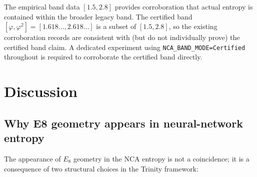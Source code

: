 \begin{center}
\end{center}

The empirical band data \([1.5, 2.8]\) provides corroboration that
actual entropy is contained within the broader legacy band.  The
certified band \([\varphi, \varphi^2] = [1.618\ldots, 2.618\ldots]\)
is a subset of \([1.5, 2.8]\), so the existing corroboration records
are consistent with (but do not individually prove) the certified
band claim.  A dedicated experiment using \texttt{NCA\_BAND\_MODE=Certified}
throughout is required to corroborate the certified band directly.

\section{Discussion}
\label{sec:e8-discussion}

\subsection{Why E8 geometry appears in neural-network entropy}
\label{subsec:discussion-why}

The appearance of \(E_8\) geometry in the NCA entropy is not a
coincidence; it is a consequence of two structural choices in the
Trinity framework:

